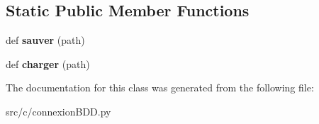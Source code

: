 \subsection*{Static Public Member Functions}
\begin{DoxyCompactItemize}
\item 
\hypertarget{classsrc_1_1c_1_1connexion_b_d_d_1_1connexion_b_d_d_a115b48fbecad46b9635aa46eba0dfbf3}{}def {\bfseries sauver} (path)\label{classsrc_1_1c_1_1connexion_b_d_d_1_1connexion_b_d_d_a115b48fbecad46b9635aa46eba0dfbf3}

\item 
\hypertarget{classsrc_1_1c_1_1connexion_b_d_d_1_1connexion_b_d_d_a8bbe3a22a577311515c3cad46266627c}{}def {\bfseries charger} (path)\label{classsrc_1_1c_1_1connexion_b_d_d_1_1connexion_b_d_d_a8bbe3a22a577311515c3cad46266627c}

\end{DoxyCompactItemize}


The documentation for this class was generated from the following file\+:\begin{DoxyCompactItemize}
\item 
src/c/connexion\+B\+D\+D.\+py\end{DoxyCompactItemize}
